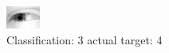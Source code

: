 \begin{figure}[h!]
\begin{center}
\includegraphics[width=0.60\columnwidth]{figures/ID2487_class_3_target_4.png}
\end{center}
\caption{ Classification: 3 actual target: 4}
\label{fig:ID2487_class_3_target_4}
\end{figure}
